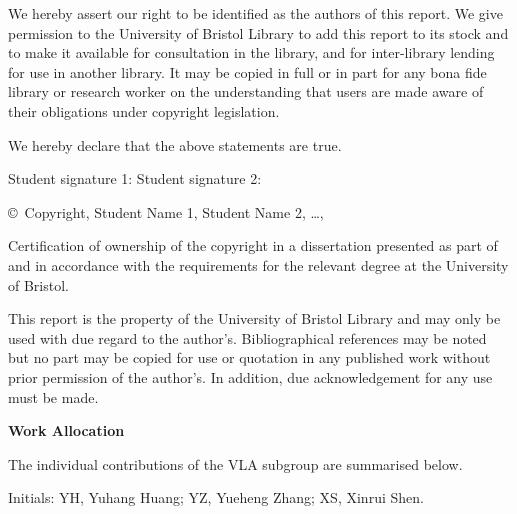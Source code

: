 \documentclass[11pt,a4paper]{article}
\newcommand{\studentnames}{Student Name 1, Student Name 2, \ldots}
\newcommand{\reportyear}{\the\year}         %
\begin{document}
\medskip
\noindent
We hereby assert our right to be identified as the authors of this report. We give permission to the University of Bristol Library to add this report to its stock and to make it available for consultation in the library, and for inter-library lending for use in another library. It may be copied in full or in part for any bona fide library or research worker on the understanding that users are made aware of their obligations under copyright legislation.

\medskip
\noindent
We hereby declare that the above statements are true.

\vspace{1cm}
\noindent
Student signature 1: \hrulefill \quad Student signature 2: \hrulefill

\vspace{1.6cm}
\noindent
\copyright\ Copyright, \studentnames, \reportyear

\medskip
\noindent
Certification of ownership of the copyright in a dissertation presented as part of and in accordance with the requirements for the relevant degree at the University of Bristol.

\medskip
\noindent
This report is the property of the University of Bristol Library and may only be used with due regard to the author's. Bibliographical references may be noted but no part may be copied for use or quotation in any published work without prior permission of the author's. In addition, due acknowledgement for any use must be made.

\clearpage

\begin{center}
  {\Large\bfseries Work Allocation}
\end{center}

\medskip
\noindent
The individual contributions of the VLA subgroup are summarised below.

\noindent
Initials: YH, Yuhang Huang; YZ, Yueheng Zhang;
XS, Xinrui Shen.
\end{document}
